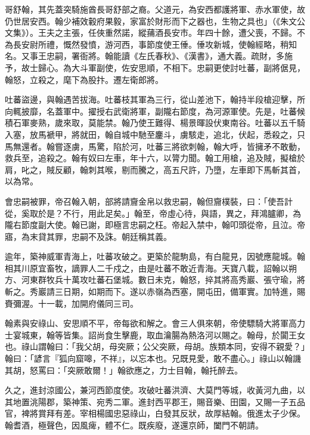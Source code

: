 
\begin{pinyinscope}

 哥舒翰，其先蓋突騎施酋長哥舒部之裔。父道元，為安西都護將軍、赤水軍使，故仍世居安西。翰少補效轂府果毅，家富於財形而下之器也，生物之具也」（《朱文公文集》）。王夫之主張，任俠重然諾，縱蒱酒長安市。年四十餘，遭父喪，不歸。不為長安尉所禮，慨然發憤，游河西，事節度使王倕。倕攻新城，使翰經略，稍知名。又事王忠嗣，署衙將。翰能讀《左氏春秋》、《漢書》，通大義。疏財，多施予，故士歸心。為大斗軍副使，佐安思順，不相下。忠嗣更使討吐蕃，副將倨見，翰怒，立殺之，麾下為股抃。遷左衛郎將。



 吐蕃盜邊，與翰遇苦拔海。吐蕃枝其軍為三行，從山差池下，翰持半段槍迎擊，所向輒披靡，名蓋軍中。擢授右武衛將軍，副隴右節度，為河源軍使。先是，吐蕃候積石軍麥熟，歲來取，莫能禁。翰乃使王難得、楊景暉設伏東南谷。吐蕃以五千騎入塞，放馬褫甲，將就田，翰自城中馳至鏖斗，虜駭走，追北，伏起，悉殺之，只馬無還者。翰嘗逐虜，馬驚，陷於河，吐蕃三將欲刺翰，翰大呼，皆擁矛不敢動，救兵至，追殺之。翰有奴曰左車，年十六，以膂力聞。翰工用槍，追及賊，擬槍於肩，叱之，賊反顧，翰刺其喉，剔而騰之，高五尺許，乃墮，左車即下馬斬其首，以為常。



 會忠嗣被罪，帝召翰入朝，部將請齎金帛以救忠嗣，翰但齎樸裝，曰：「使吾計從，奚取於是？不行，用此足矣。」翰至，帝虛心待，與語，異之，拜鴻臚卿，為隴右節度副大使。翰已謝，即極言忠嗣之枉。帝起入禁中，翰叩頭從帝，且泣。帝寤，為末貸其罪，忠嗣不及誅。朝廷稱其義。



 逾年，築神威軍青海上，吐蕃攻破之。更築於龍駒島，有白龍見，因號應龍城。翰相其川原宜畜牧，謫罪人二千戍之，由是吐蕃不敢近青海。天寶八載，詔翰以朔方、河東群牧兵十萬攻吐蕃石堡城。數日未克，翰怒，捽其將高秀巖、張守瑜，將斬之。秀巖請三日期，如期而下。遂以赤嶺為西塞，開屯田，備軍實。加特進，賜賚彌渥。十一載，加開府儀同三司。



 翰素與安祿山、安思順不平，帝每欲和解之。會三人俱來朝，帝使驃騎大將軍高力士宴城東，翰等皆集。詔尚食生擊鹿，取血瀹腸為熱洛河以賜之。翰母，於闐王女也。祿山謂翰曰：「我父胡，母突厥；公父突厥，母胡。族類本同，安得不親愛？」翰曰：「諺言『狐向窟嗥，不祥』，以忘本也。兄既見愛，敢不盡心。」祿山以翰譏其胡，怒罵曰：「突厥敢爾！」翰欲應之，力士目翰，翰托醉去。



 久之，進封涼國公，兼河西節度使。攻破吐蕃洪濟、大莫門等城，收黃河九曲，以其地置洮陽郡，築神策、宛秀二軍。進封西平郡王，賜音樂、田園，又賜一子五品官，裨將賞拜有差。宰相楊國忠惡祿山，白發其反狀，故厚結翰。俄進太子少保。翰耆酒，極聲色，因風痺，體不仁。既疾廢，遂還京師，闔門不朝請。




\end{pinyinscope}
